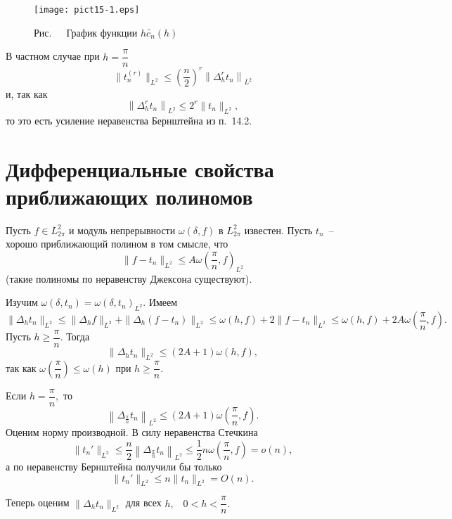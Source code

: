 \begin{figure}[ht]
\begin{center}
\texttt{[image: pict15-1.eps]}
\end{center}

 \label{r15-1}
 \centerline{Рис.~\theris\ \ График функции $h\widetilde{c_n}(h)$}
\end{figure}


В частном случае при $h=\dfrac{\pi}{n}$
$$
\|t_n^{(r)}\|_{{L^2}}\le \left( \frac{n}{2}\right)^r \left\| \Delta_h^{r}t_n\right\|_{{L^2}}
$$
и, так как
$$
\left\| \Delta_h^{r} t_n\right\|_{{L^2}}\le 2^r \|t_n\|_{{L^2}},
$$
то это есть усиление неравенства Бернштейна из п.~14.2.


\section{Дифференциальные свойства приближающих полиномов}

Пусть  {$f\in L_{2\pi}^2$} и модуль непрерывности $\omega(\delta,f)$ {в $L_{2\pi}^2$} известен.
Пусть $t_n$~-- хорошо приближающий полином {в том смысле, что}
\begin{equation}\label{l15-tk2}
\|f-t_n\|_{{L^2}}\le A\omega\left(
\frac{\pi}{n},f\right)_{L^2}
\end{equation}
(такие полиномы по неравенству Джексона существуют).

Изучим $\omega(\delta,t_n)=\omega(\delta,t_n)_{L^2}.$ Имеем
$$
\|\Delta_h t_n\|_{{L^2}}\le \|\Delta_h f\|_{{L^2}}+\|\Delta_h
(f-t_n)\|_{L^2}\le \omega(h,f)+2\|f-t_n\|_{{L^2}}\le
\omega(h,f)+2A\omega\left(\frac{\pi}{n},f\right).
$$
Пусть $h\ge \dfrac{\pi}{n}.$ Тогда
$$
\|\Delta_h t_n\|_{{L^2}}\le (2A+1)\omega (h,f),
$$
так как $\omega\left( \dfrac{\pi}{n}\right) \le \omega(h)$ при $h\ge \dfrac{\pi}{n}.$

Если $h=\dfrac{\pi}{n},$ то
$$
\left\| \Delta_{\frac{\pi}{n}}t_n \right\|_{{L^2}}\le (2A+1)\omega\left(
\frac{\pi}{n},f\right).
$$
Оценим норму производной. В силу неравенства Стечкина
$$
\|t_n'\|_{{L^2}}\le \frac{n}{2}
\left\| \Delta_{\frac{\pi}{n}}t_n \right\|_{{L^2}}\le \frac12 n\omega \left(
\frac{\pi}{n},f\right)=o(n),
$$
а по неравенству Бернштейна получили бы только
$$
\|t_n'\|_{{L^2}}\le n\|t_n\|_{{L^2}}=O(n).
$$

Теперь оценим $\|\Delta_h t_n\|_{{L^2}}$ для всех $h,$~ $0<h<\dfrac{\pi}{n}.$

